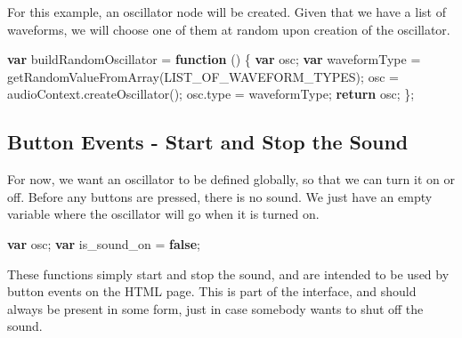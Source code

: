 \documentclass[]{article}
\newenvironment{Shaded}{}{}
\newcommand{\KeywordTok}[1]{\textcolor[rgb]{0.00,0.44,0.13}{\textbf{#1}}}
\newcommand{\VariableTok}[1]{\textcolor[rgb]{0.10,0.09,0.49}{#1}}
\newcommand{\ControlFlowTok}[1]{\textcolor[rgb]{0.00,0.44,0.13}{\textbf{#1}}}
\newcommand{\OperatorTok}[1]{\textcolor[rgb]{0.40,0.40,0.40}{#1}}
\newcommand{\AttributeTok}[1]{\textcolor[rgb]{0.49,0.56,0.16}{#1}}
\newcommand{\NormalTok}[1]{#1}
\begin{document}
For this example, an oscillator node will be created. Given that we have
a list of waveforms, we will choose one of them at random upon creation
of the oscillator.

\begin{Shaded}
\begin{Highlighting}[]
\KeywordTok{var}\NormalTok{ buildRandomOscillator }\OperatorTok{=} \KeywordTok{function}\NormalTok{ () }\OperatorTok{\{}
    \KeywordTok{var}\NormalTok{ osc}\OperatorTok{;}
    \KeywordTok{var}\NormalTok{ waveformType }\OperatorTok{=} \AttributeTok{getRandomValueFromArray}\NormalTok{(LIST_OF_WAVEFORM_TYPES)}\OperatorTok{;}
\NormalTok{    osc }\OperatorTok{=} \VariableTok{audioContext}\NormalTok{.}\AttributeTok{createOscillator}\NormalTok{()}\OperatorTok{;}
    \VariableTok{osc}\NormalTok{.}\AttributeTok{type} \OperatorTok{=}\NormalTok{ waveformType}\OperatorTok{;}
    \ControlFlowTok{return}\NormalTok{ osc}\OperatorTok{;}
\OperatorTok{\};}  
\end{Highlighting}
\end{Shaded}

\subsection{Button Events - Start and Stop the
Sound}\label{button-events---start-and-stop-the-sound}

For now, we want an oscillator to be defined globally, so that we can
turn it on or off. Before any buttons are pressed, there is no sound. We
just have an empty variable where the oscillator will go when it is
turned on.

\begin{Shaded}
\begin{Highlighting}[]
\KeywordTok{var}\NormalTok{ osc}\OperatorTok{;}
\KeywordTok{var}\NormalTok{ is_sound_on }\OperatorTok{=} \KeywordTok{false}\OperatorTok{;}
\end{Highlighting}
\end{Shaded}

These functions simply start and stop the sound, and are intended to be
used by button events on the HTML page. This is part of the interface,
and should always be present in some form, just in case somebody wants
to shut off the sound.
\end{document}
